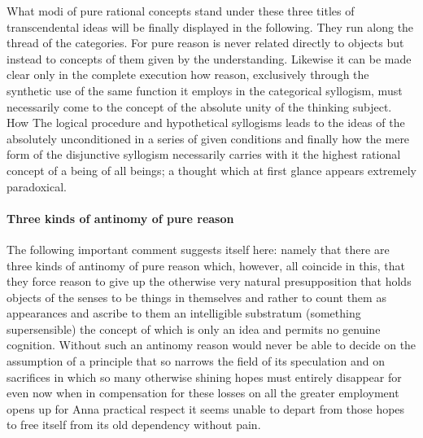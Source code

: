 \documentclass{article}
\begin{document}
What modi of pure rational concepts stand 
under these three titles of transcendental ideas
will be finally displayed in the following.
They run along the thread of the categories.
For pure reason is never related directly to objects but instead to
concepts of them given by the understanding.
Likewise it can be made clear only in the complete execution how reason,
exclusively through the synthetic use of the same function
it employs in the categorical syllogism,
must necessarily come to the concept of the absolute unity of the thinking subject.
How The logical procedure and hypothetical syllogisms leads to the
ideas of the absolutely unconditioned in a series of given conditions and 
finally how the mere form of the disjunctive syllogism necessarily carries with it
the highest rational concept of a being of all beings;
a thought which at first glance appears extremely paradoxical.

\paragraph{Three kinds of antinomy of pure reason}

The following important comment suggests itself here:
namely that there are three kinds of antinomy of pure reason
which, however, all coincide in this,
that they force reason to give up the otherwise very natural presupposition 
that holds objects of the senses to be things in themselves
and rather to count them as appearances and ascribe to them 
an intelligible substratum (something supersensible) 
the concept of which is only an idea and permits no genuine cognition.
Without such an antinomy reason would never be able to decide
on the assumption of a principle that so narrows the field of its
speculation and on sacrifices in which so many otherwise
shining hopes must entirely disappear for even now when in 
compensation for these losses on all the greater employment opens up for 
Anna practical respect it seems unable to depart from those hopes to free itself
from its old dependency without pain.
\end{document}
